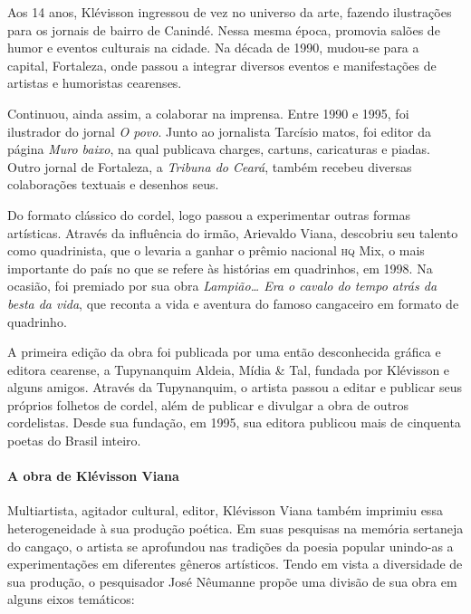 \documentclass[11pt]{extarticle}
\begin{document}
Aos 14 anos, Klévisson ingressou de vez no universo da arte, fazendo ilustrações para os jornais de bairro de Canindé. Nessa mesma época, promovia salões de humor e eventos culturais na cidade. Na década de 1990, mudou-se para a capital, Fortaleza, onde passou a integrar diversos eventos e manifestações de artistas e humoristas cearenses.

Continuou, ainda assim, a colaborar na imprensa. Entre 1990 e 1995, foi ilustrador do jornal \textit{O povo}. Junto ao jornalista Tarcísio matos, foi editor da página \textit{Muro baixo}, na qual publicava charges, cartuns, caricaturas e piadas. Outro jornal de Fortaleza, a
\textit{Tribuna do Ceará}, também recebeu diversas colaborações textuais e desenhos seus.

Do formato clássico do cordel, logo passou a experimentar outras formas artísticas. Através da influência do irmão, Arievaldo Viana, descobriu seu talento como quadrinista, que o levaria a ganhar o prêmio nacional \textsc{hq} Mix, o mais importante do país no que se refere às histórias em quadrinhos, em 1998. Na ocasião, foi premiado por sua obra \textit{Lampião\ldots{} Era o cavalo do tempo atrás da besta da vida}, que reconta a vida e aventura do famoso cangaceiro em formato de quadrinho.

A primeira edição da obra foi publicada por uma então desconhecida gráfica e editora cearense, a Tupynanquim Aldeia, Mídia \& Tal, fundada por Klévisson e alguns amigos. Através da Tupynanquim, o artista passou a editar e publicar seus próprios folhetos de cordel, além de publicar e divulgar a obra de outros cordelistas. Desde sua fundação, em 1995, sua editora publicou mais de cinquenta poetas do Brasil inteiro.


\paragraph{A obra de Klévisson Viana}
Multiartista, agitador cultural, editor, Klévisson Viana também imprimiu essa heterogeneidade à sua produção poética. Em suas pesquisas na memória sertaneja do cangaço, o artista se aprofundou  nas tradições da poesia popular unindo-as a experimentações em diferentes gêneros artísticos. 
Tendo em vista a diversidade de sua produção, o pesquisador José Nêumanne propõe uma divisão de sua obra em alguns eixos temáticos:
\end{document}
